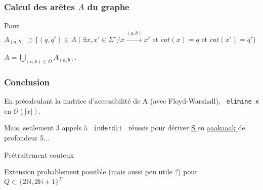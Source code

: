 \documentclass[12pt]{beamer}
\begin{document}
\begin{frame}\frametitle{Calcul des arêtes $A$ du graphe}
Pour
$A_{(a,b)} \supset \{(q,q') \in A \mid \exists x,x' \in \Sigma^\star / x \overset{(a,b)}{\rightarrow} x' \text{ et } cat(x) = q \text{ et } cat(x') = q'\}$

$A = \bigcup_{(a,b) \in D}  A_{(a,b)}$.

\end{frame}

\begin{frame}\frametitle{Conclusion}
En précalculant la matrice d'accessibilité de A (avec Floyd-Warshall), \texttt{ elimine x } en $\mathcal{O} (|x|)$.
\pause

Mais, seulement 3 appels à \texttt{ inderdit } réussis pour dériver \underline{ S } en \underline{ aaakaaak } de profondeur 5...
\pause

Prétraitement couteux
\pause

Extension probablement possible (mais aussi peu utile ?) pour $Q \subset \{2 \mathbb{N} , 2 \mathbb{N} + 1 \}^\Sigma$

\end{frame}
\end{document}
